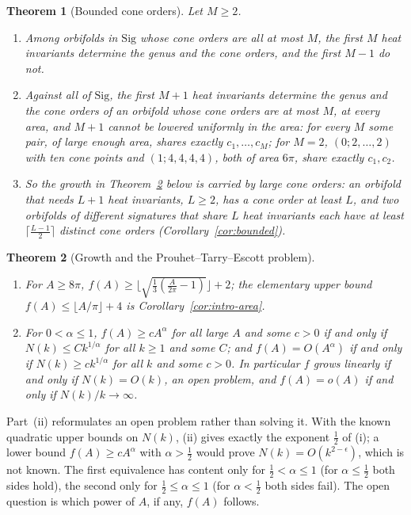 \documentclass[pdflatex,sn-mathphys-num]{sn-jnl}
\theoremstyle{thmstyleone}%
\newtheorem{theorem}{Theorem}[section]%
\theoremstyle{thmstylethree}%
\newcommand{\Sig}{\mathrm{Sig}}
\begin{document}
\begin{theorem}[Bounded cone orders]\label{thm:intro-bounded}
Let $M\ge2$.
\begin{enumerate}[label=(\roman*)]
\item Among orbifolds in $\Sig$ whose cone orders are all at most $M$, the first $M$ heat invariants determine the genus and the cone orders, and the first $M-1$ do not.
\item Against all of $\Sig$, the first $M+1$ heat invariants determine the genus and the cone orders of an orbifold whose cone orders are at most $M$, at every area, and $M+1$ cannot be lowered uniformly in the area: for every $M$ some pair, of large enough area, shares exactly $c_1,\dots,c_M$; for $M=2$, $(0;2,\dots,2)$ with ten cone points and $(1;4,4,4,4)$, both of area $6\pi$, share exactly $c_1,c_2$.
\item So the growth in Theorem~\ref{thm:intro-growth} below is carried by large cone orders: an orbifold that needs $L+1$ heat invariants, $L\ge2$, has a cone order at least $L$, and two orbifolds of different signatures that share $L$ heat invariants each have at least $\lceil\frac{L-1}2\rceil$ distinct cone orders (Corollary~\ref{cor:bounded}).
\end{enumerate}
\end{theorem}

\begin{theorem}[Growth and the Prouhet--Tarry--Escott problem]\label{thm:intro-growth}
\leavevmode
\begin{enumerate}[label=(\roman*)]
\item For $A\ge8\pi$, $f(A)\ge\lfloor\sqrt{\frac13(\frac A{2\pi}-1)}\rfloor+2$; the elementary upper bound $f(A)\le\lfloor A/\pi\rfloor+4$ is Corollary~\ref{cor:intro-area}.
\item For $0<\alpha\le1$, $f(A)\ge cA^\alpha$ for all large $A$ and some $c>0$ if and only if $N(k)\le Ck^{1/\alpha}$ for all $k\ge1$ and some $C$; and $f(A)=O(A^\alpha)$ if and only if $N(k)\ge ck^{1/\alpha}$ for all $k$ and some $c>0$. In particular $f$ grows linearly if and only if $N(k)=O(k)$, an open problem, and $f(A)=o(A)$ if and only if $N(k)/k\to\infty$.
\end{enumerate}
\end{theorem}

Part~(ii) reformulates an open problem rather than solving it. With the known quadratic upper bounds on $N(k)$, (ii) gives exactly the exponent $\frac12$ of (i); a lower bound $f(A)\ge cA^\alpha$ with $\alpha>\frac12$ would prove $N(k)=O(k^{2-\epsilon})$, which is not known. The first equivalence has content only for $\frac12<\alpha\le1$ (for $\alpha\le\frac12$ both sides hold), the second only for $\frac12\le\alpha\le1$ (for $\alpha<\frac12$ both sides fail). The open question is which power of $A$, if any, $f(A)$ follows.
\end{document}
